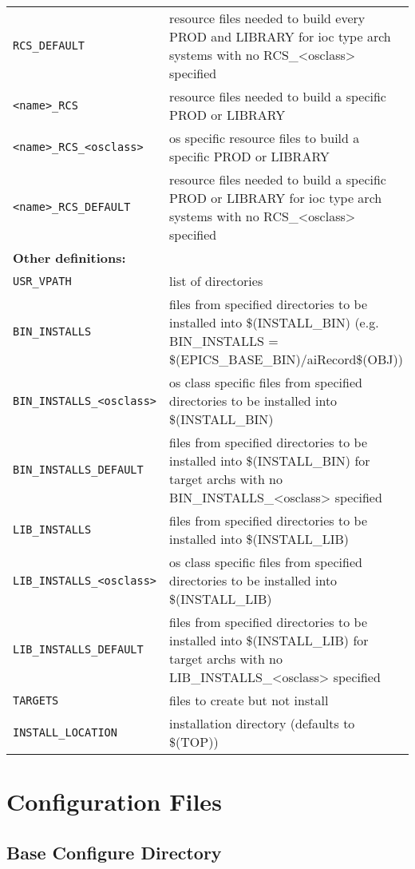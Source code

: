 \begin{center}
\begin{longtable}{p{2.94784in}p{3.76247in}}
\verb|RCS_DEFAULT| & resource files needed to build every PROD and LIBRARY for ioc type arch systems with no RCS\_\textless{}osclass\textgreater{} specified\\
\verb|<name>_RCS| & resource files needed to build a specific PROD or LIBRARY\\
\verb|<name>_RCS_<osclass>| & os specific resource files to build a specific PROD or LIBRARY\\
\verb|<name>_RCS_DEFAULT| & resource files needed to build a specific PROD or LIBRARY for ioc type arch systems with no RCS\_\textless{}osclass\textgreater{} specified\\
\textbf{Other definitions: } &    \\
\hline
\verb|USR_VPATH| & list of directories\\
\verb|BIN_INSTALLS| & files from specified directories to be installed into \$(INSTALL\_BIN) (e.g. BIN\_INSTALLS = \$(EPICS\_BASE\_BIN)/aiRecord\$(OBJ))\\
\verb|BIN_INSTALLS_<osclass>| & os class specific files from specified directories to be installed into \$(INSTALL\_BIN)\\
\verb|BIN_INSTALLS_DEFAULT| & files from specified directories to be installed into \$(INSTALL\_BIN) for target archs with no BIN\_INSTALLS\_\textless{}osclass\textgreater{} specified\\
\verb|LIB_INSTALLS| & files from specified directories to be installed into \$(INSTALL\_LIB)\\
\verb|LIB_INSTALLS_<osclass>| & os class specific files from specified directories to be installed into \$(INSTALL\_LIB)\\
\verb|LIB_INSTALLS_DEFAULT| & files from specified directories to be installed into \$(INSTALL\_LIB) for target archs with no LIB\_INSTALLS\_\textless{}osclass\textgreater{} specified\\
\verb|TARGETS| & files to create but not install\\
\verb|INSTALL_LOCATION| & installation directory (defaults to \$(TOP))
\end{longtable}\end{center}


\section{Configuration Files}

\subsection{Base Configure Directory}

